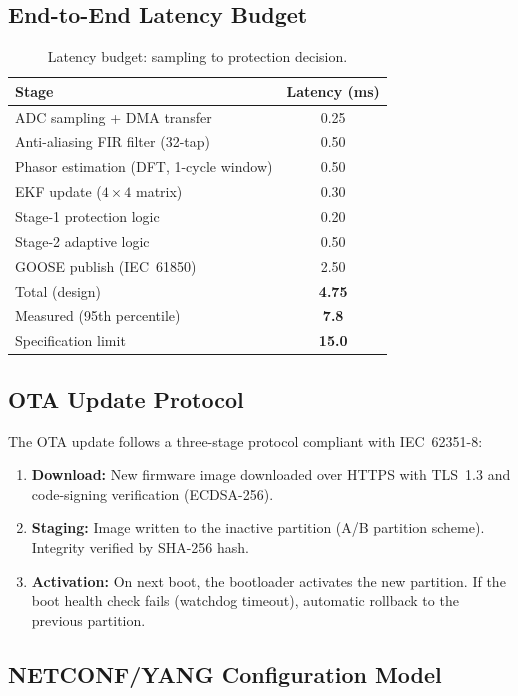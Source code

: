 \documentclass[11pt, a4paper]{article}
\begin{document}
\subsection{End-to-End Latency Budget}

\begin{table}[ht]
\centering
\caption{Latency budget: sampling to protection decision.}
\label{tab:latency}
\begin{tabular}{lc}
\toprule
Stage & Latency (ms) \\
\midrule
ADC sampling + DMA transfer & 0.25 \\
Anti-aliasing FIR filter (32-tap) & 0.50 \\
Phasor estimation (DFT, 1-cycle window) & 0.50 \\
EKF update ($4\times 4$ matrix) & 0.30 \\
Stage-1 protection logic & 0.20 \\
Stage-2 adaptive logic & 0.50 \\
GOOSE publish (IEC~61850) & 2.50 \\
\midrule
Total (design) & \textbf{4.75} \\
Measured (95th percentile) & \textbf{7.8} \\
Specification limit & \textbf{15.0} \\
\bottomrule
\end{tabular}
\end{table}

\subsection{OTA Update Protocol}

The OTA update follows a three-stage protocol compliant with IEC~62351-8:

\begin{enumerate}
  \item \textbf{Download:} New firmware image downloaded over HTTPS with
    TLS~1.3 and code-signing verification (ECDSA-256).
  \item \textbf{Staging:} Image written to the inactive partition (A/B
    partition scheme). Integrity verified by SHA-256 hash.
  \item \textbf{Activation:} On next boot, the bootloader activates the
    new partition. If the boot health check fails (watchdog timeout),
    automatic rollback to the previous partition.
\end{enumerate}

\subsection{NETCONF/YANG Configuration Model}
\end{document}
